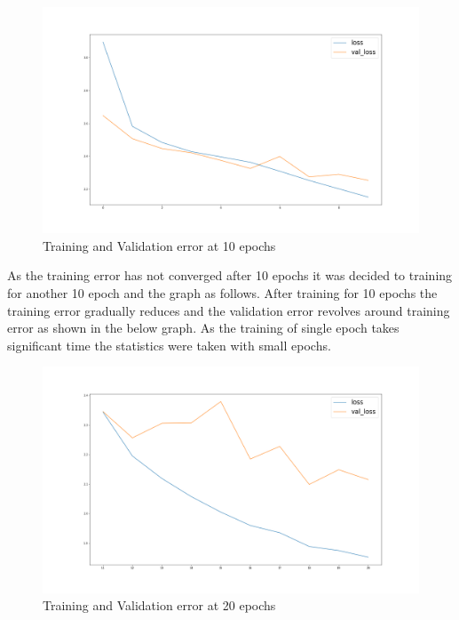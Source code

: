 \begin{figure}[H]
\includegraphics[scale=0.4]{conf0_loss-val_loss_0_10epochs}
\begin{center}
\caption{Training and Validation error at 10 epochs}
\end{center}
\end{figure}
As the training error has not converged after 10 epochs it was decided to training for another 10 epoch and the graph as follows. After training for 10 epochs the training error gradually reduces and the validation error revolves around training error as shown in the below graph. As the training of single epoch takes significant time the statistics were taken with small epochs.

\begin{figure}[H]
\includegraphics[scale=0.4]{conf0_loss-val_loss_10_20epochs}
\begin{center}
\caption{Training and Validation error at 20 epochs}
\end{center}
\end{figure}

